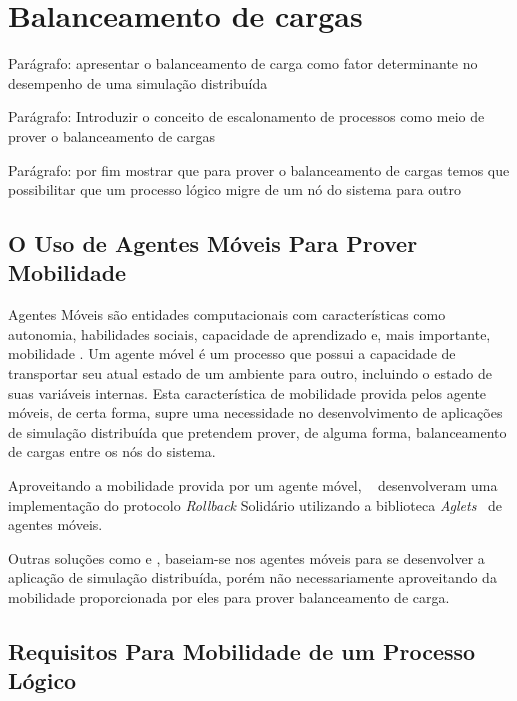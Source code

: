 \section{Balanceamento de cargas}

Parágrafo: apresentar o balanceamento de carga como fator determinante no desempenho de uma simulação distribuída

Parágrafo: Introduzir o conceito de escalonamento de processos como meio de prover o balanceamento de cargas

Parágrafo: por fim mostrar que para prover o balanceamento de cargas temos que possibilitar que um processo lógico migre de um nó do sistema para outro

\subsection{O Uso de Agentes Móveis Para Prover Mobilidade}


Agentes Móveis são entidades computacionais com características como autonomia, habilidades sociais, capacidade de aprendizado e, mais importante, mobilidade \cite{MOBILE-AGENTS-WIKIPEDIA}. Um agente móvel é um processo que possui a capacidade de transportar seu atual estado de um ambiente para outro, incluindo o estado de suas variáveis internas. Esta característica de mobilidade provida pelos agente móveis, de certa forma, supre uma necessidade no desenvolvimento de aplicações de simulação distribuída que pretendem prover, de alguma forma, balanceamento de cargas entre os nós do sistema.


Aproveitando a mobilidade provida por um agente móvel, ~\cite{RIBEIROALVES} desenvolveram uma implementação do protocolo \textit{Rollback} Solidário utilizando a biblioteca \textit{Aglets}~\cite{AGLETS} de agentes móveis.


Outras soluções como \cite{SASSY} e \cite{}, baseiam-se nos agentes móveis para se desenvolver a aplicação de simulação distribuída, porém não necessariamente aproveitando da mobilidade proporcionada por eles para prover balanceamento de carga.

\subsection{Requisitos Para Mobilidade de um Processo Lógico}

